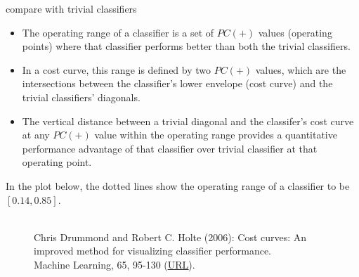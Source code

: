 \begin{vbframe}{compare with trivial classifiers}
  \begin{itemize}
    \item The operating range of a classifier is a set of $PC(+)$ values (operating points) where that classifier performs better than both the trivial classifiers.
    \item In a cost curve, this range is defined by two $PC(+)$ values, which are the intersections between the classifier's lower envelope (cost curve) and the trivial classifiers' diagonals.
    \item The vertical distance between a trivial diagonal and the classifer's cost curve at any $PC(+)$ value within the operating range provides a quantitative performance advantage of that classifier over trivial classifier at that operating point.
  \end{itemize}
  \pagebreak
  In the plot below, the dotted lines show the operating range of a classifier to be $[0.14, 0.85]$.
  \begin{figure}
    \centering
    \tiny
    \\Chris Drummond and Robert C. Holte (2006): Cost curves: An improved
    method for visualizing classifier performance. \\Machine Learning, 65, 95-130
    (\href{https://www.semanticscholar.org/paper/Cost-curves\%3A-An-improved-method-for  -visualizing-Drummond-Holte/71708ce984e0896e7383435913547e770572410e}
    {\underline{URL}}).
  \end{figure}
  
\end{vbframe}

